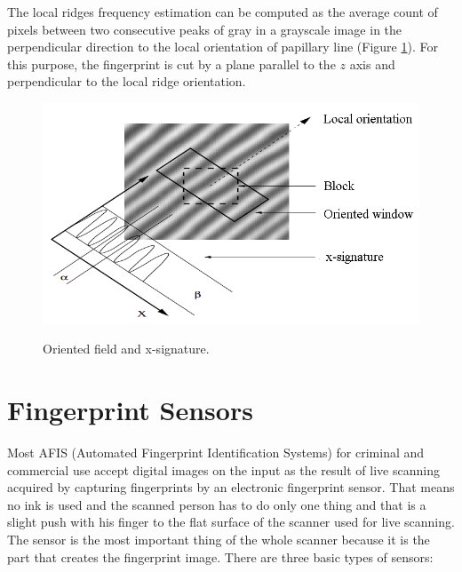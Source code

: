 The local ridges frequency estimation can be computed as the average count of pixels between two consecutive peaks of gray in a grayscale image in the perpendicular direction to the local orientation of papillary line (Figure \ref{fig:freq}). For this purpose, the fingerprint is cut by a plane parallel to the $z$ axis and perpendicular to the local ridge orientation. \cite{hong1998fingerprint}

\begin{figure}[H]
    \centering
        {\includegraphics[width=0.7\linewidth]{obrazky-figures/freq.png}}\\
        \caption{Oriented field and x-signature. \cite{hong1998fingerprint}}
        \label{fig:freq}
\end{figure}

\section{Fingerprint Sensors}
\label{sensors}
Most AFIS (Automated Fingerprint Identification Systems) for criminal and commercial use accept digital images on the input as the result of live scanning acquired by capturing fingerprints by an electronic fingerprint sensor. That means no ink is used and the scanned person has to do only one thing and that is a slight push with his finger to the flat surface of the scanner used for live scanning. The sensor is the most important thing of the whole scanner because it is the part that creates the fingerprint image. There are three basic types of sensors: \cite{jain2007handbook}   

